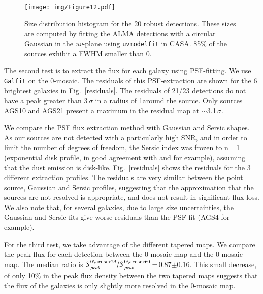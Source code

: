 \documentclass[longauth]{aa}
\begin{document}
   \begin{figure}
   \centering
   \texttt{[image: img/Figure12.pdf]}
      \caption{Size distribution histogram for the 20 robust detections. These sizes are computed by fitting the ALMA detections with a circular Gaussian in the \textit{uv}-plane using \texttt{uvmodelfit} in CASA. 85\% of the sources exhibit a FWHM smaller than 0.}
         \label{size_distribution}
   \end{figure}


The second test is to extract the flux for each galaxy using PSF-fitting. We use \texttt{Galfit} \citep{Peng2010} on the 0-mosaic. The residuals of this PSF-extraction are shown for the 6 brightest galaxies in Fig.~\ref{residuals}. The residuals of 21/23 detections do not have a peak greater than 3\,$\sigma$ in a radius of 1\arcsec around the source. Only sources AGS10 and AGS21 present a maximum in the residual map at $\sim$3.1\,$\sigma$.

We compare the PSF flux extraction method with Gaussian and Sersic shapes. As our sources are not detected with a particularly high SNR, and in order to limit the number of degrees of freedom, the Sersic index was frozen to n\,=\,1 (exponential disk profile, in good agreement with \citealt{Hodge2016} and \citealt{Elbaz2017} for example), assuming that the dust emission is disk-like. Fig.~\ref{residuals} shows the residuals for the 3 different extraction profiles. The residuals are very similar between the point source, Gaussian and Sersic profiles, suggesting that the approximation that the sources are not resolved is appropriate, and does not result in significant flux loss. We also note that, for several galaxies, due to large size uncertainties, the Gaussian and Sersic fits give worse residuals than the PSF fit (AGS4 for example).

For the third test, we take advantage of the different tapered maps. We compare the peak flux for each detection between the 0-mosaic map and the 0-mosaic map. The median ratio is $S_{peak}^{0\arcsec29}/S_{peak}^{0\arcsec60}$\,=\,0.87$\pm$0.16. This small decrease, of only 10\% in the peak flux density between the two tapered maps suggests that the flux of the galaxies is only slightly more resolved in the 0-mosaic map.
\end{document}
